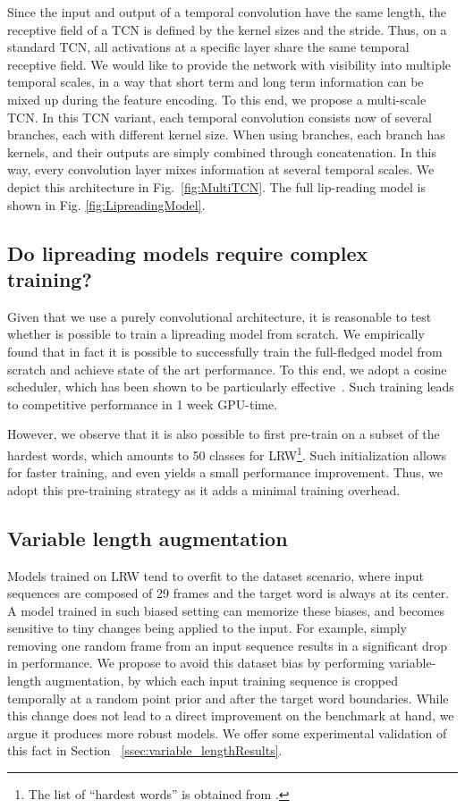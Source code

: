 \documentclass{article}
\begin{document}
Since the input and output of a temporal convolution have the same length, the receptive field of a TCN is defined by the kernel sizes and the stride. Thus, on a standard TCN, all activations at a specific layer share the same temporal receptive field. We would like to provide the network with visibility into multiple temporal scales, in a way that short term and long term information can be mixed up during the feature encoding. To this end, we propose a multi-scale TCN. In this TCN variant, each temporal convolution consists now of several branches, each with different kernel size. When using  branches, each branch has  kernels, and their outputs are simply combined through concatenation. In this way, every convolution layer mixes information at several temporal scales. We depict this architecture in Fig.~\ref{fig:MultiTCN}. The full lip-reading model is shown in Fig. \ref{fig:LipreadingModel}.



\subsection{Do lipreading models require complex training?}

Given that we use a purely convolutional architecture, it is reasonable to test whether is possible to train a lipreading model from scratch. We empirically found that in fact it is possible to successfully train the full-fledged model from scratch and achieve state of the art performance. To this end, we adopt a cosine scheduler, which has been shown to be particularly effective~\cite{sgdr17}. Such training leads to competitive performance in 1 week GPU-time.

However, we observe that it is also possible to first pre-train on a subset of the  hardest words, which amounts to 50 classes for LRW\footnote{The list of ``hardest words'' is obtained from \cite{stafylakis17}.}. Such initialization allows for faster training, and even yields a small performance improvement. Thus, we adopt this pre-training strategy as it adds a minimal training overhead. 


\subsection{Variable length augmentation} 
\label{ssec:varLenAugm}

Models trained on LRW tend to overfit to the dataset scenario, where input sequences are composed of 29 frames and the target word is always at its center. A model trained in such biased setting can memorize these biases, and becomes sensitive to tiny changes being applied to the input. For example, simply removing one random frame from an input sequence results in a significant drop in performance. We propose to avoid this dataset bias by performing variable-length augmentation, by which each input training sequence is cropped temporally at a random point prior and after the target word boundaries. While this change does not lead to a direct improvement on the benchmark at hand, we argue it produces more robust models. We offer some experimental validation of this fact in Section ~\ref{ssec:variable_lengthResults}.
\end{document}
